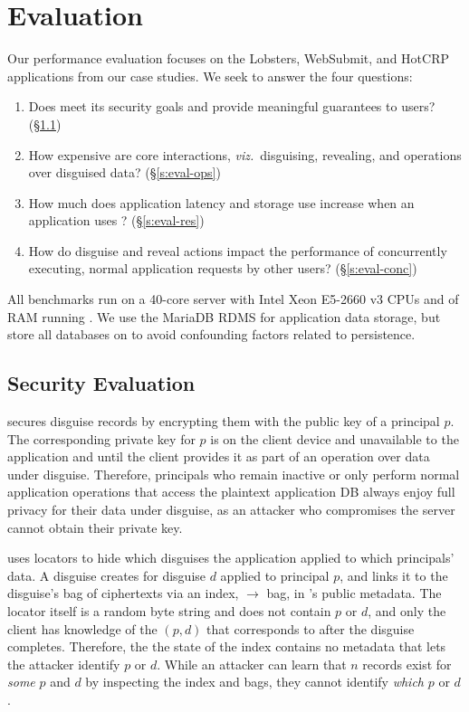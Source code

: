 \section{Evaluation}
\label{s:eval}

%
Our performance evaluation focuses on the Lobsters, WebSubmit, and HotCRP applications
from our case studies.
%
We seek to answer the four questions:
%
\begin{enumerate}[nosep]
 \item Does \sys meet its security goals and provide meaningful guarantees to users?
   (\S\ref{s:eval-security})
 \item How expensive are core \sys interactions, \emph{viz.}\ disguising, revealing, and
   operations over disguised data? (\S\ref{s:eval-ops})
 \item How much does application latency and storage use increase when an application
   uses \sys? (\S\ref{s:eval-res})
 \item How do disguise and reveal actions impact the performance of concurrently executing,
   normal application requests by other users? (\S\ref{s:eval-conc})
\end{enumerate}
%
All benchmarks run on a 40-core server with Intel Xeon E5-2660 v3 CPUs and  of RAM
running .
%
We use the MariaDB RDMS for application data storage, but store all databases on 
to avoid confounding factors related to persistence.
%

\subsection{Security Evaluation}
\label{s:eval-security}

%
\sys secures disguise records by encrypting them with the public key of a principal $p$.
%
The corresponding private key for $p$ is on the client device and unavailable to the
application and \sys until the client provides it as part of an operation over data
under disguise.
%
Therefore, principals who remain inactive or only perform normal application operations
that access the plaintext application DB always enjoy full privacy for their data under
disguise, as an attacker who compromises the server cannot obtain their private key.
%

%
\sys uses locators to hide which disguises the application applied to which
principals' data.
%
A disguise creates  for disguise $d$ applied to principal $p$, and links it
to the disguise's bag of ciphertexts via an index, $\to$ bag, in \sys's
public metadata.
%
The locator itself is a random byte string and does not contain $p$ or $d$, and
only the client has knowledge of the $(p, d)$ that  corresponds to after
the disguise completes.
%
Therefore, the the state of the index contains no metadata that lets the attacker
identify $p$ or $d$.
%
While an attacker can learn that $n$ records exist for \emph{some} $p$ and $d$ by
inspecting the index and bags, they cannot identify \emph{which} $p$ or $d$.
%

